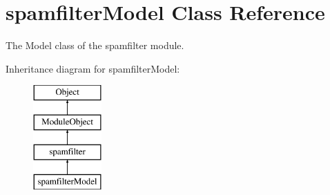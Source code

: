 \hypertarget{classspamfilterModel}{}\section{spamfilter\+Model Class Reference}
\label{classspamfilterModel}


The Model class of the spamfilter module.  


Inheritance diagram for spamfilter\+Model\+:\begin{figure}[H]
\begin{center}
\leavevmode
\includegraphics[height=4.000000cm]{classspamfilterModel}
\end{center}
\end{figure}
